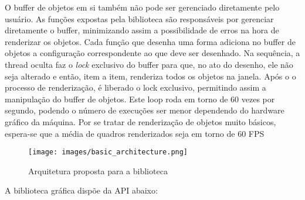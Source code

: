 \documentclass[12pt, %
openright,
oneside, %
a4paper,    %
brazil]{facom-ufu-abntex2}
\begin{document}
O buffer de objetos em si também não pode ser gerenciado diretamente pelo usuário. As funções expostas pela biblioteca são responsáveis por gerenciar diretamente o buffer, minimizando assim a possibilidade de erros na hora de renderizar os objetos. Cada função que desenha uma forma adiciona no buffer de objetos a configuração  correspondente ao que deve ser desenhado. Na sequência, a thread oculta faz o \textit{lock} exclusivo do buffer para que, no ato do desenho, ele não seja alterado e então, item a item, renderiza todos os objetos na janela. Após o o processo de renderização, é liberado o lock exclusivo, permitindo assim a manipulação do buffer de objetos. Este loop roda em torno de 60 vezes por segundo, podendo o número de execuções ser menor dependendo do hardware gráfico da máquina. Por se tratar de renderização de objetos muito básicos, espera-se que a média de quadros renderizados seja em torno de 60 FPS

\begin{figure}[htbp]
  \centering
  \texttt{[image: images/basic\_architecture.png]}
  \caption{Arquitetura proposta para a biblioteca}
  \label{fig:arquitetura_proposta}
\end{figure}

A biblioteca gráfica dispõe da API abaixo:
\end{document}
